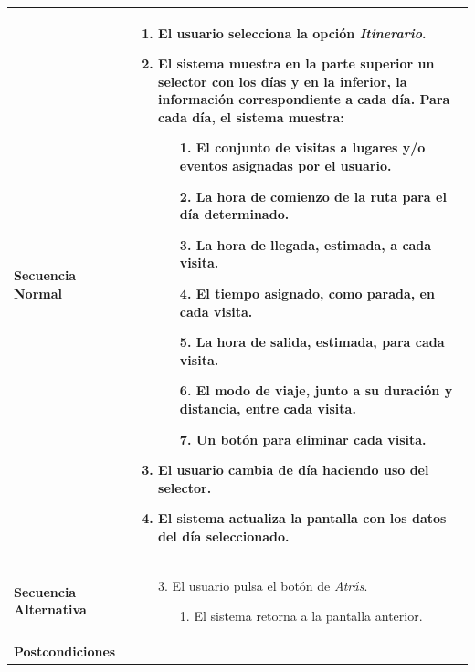 \begin{longtable}{| p{4cm} | p{10cm} |}
\hline
\textbf{Secuencia Normal} &\mbox{}\par\vspace{-\baselineskip}
\begin{enumerate}[leftmargin=0.7cm, topsep=0.1cm]
\item El usuario selecciona la opción \textit{Itinerario}.
\item El sistema muestra en la parte superior un selector con los días y en la inferior, la información correspondiente a cada día. Para cada día, el sistema muestra:
	\begin{itemize}
	\item [1.] El conjunto de visitas a lugares y/o eventos asignadas por el usuario.
	\item [2.] La hora de comienzo de la ruta para el día determinado.
	\item [3.] La hora de llegada, estimada, a cada visita.
	\item [4.] El tiempo asignado, como parada, en cada visita.
	\item [5.] La hora de salida, estimada, para cada visita.
	\item [6.] El modo de viaje, junto a su duración y distancia, entre cada visita.
	\item [7.] Un botón para eliminar cada visita.
	\end{itemize}
\item El usuario cambia de día haciendo uso del selector.
\item El sistema actualiza la pantalla con los datos del día seleccionado.
\end{enumerate}


\\
\hline
\textbf{Secuencia Alternativa} &\mbox{}\par\vspace{-\baselineskip}
\begin{enumerate}[leftmargin=0.9cm, topsep=0.1cm]
\item[3.] El usuario pulsa el botón de \textit{Atrás}.
	\begin{itemize}
	\item[1.] El sistema retorna a la pantalla anterior.
	\end{itemize}
\end{enumerate}
\\

\hline
\textbf{Postcondiciones} & \\
\hline
\end{longtable}



